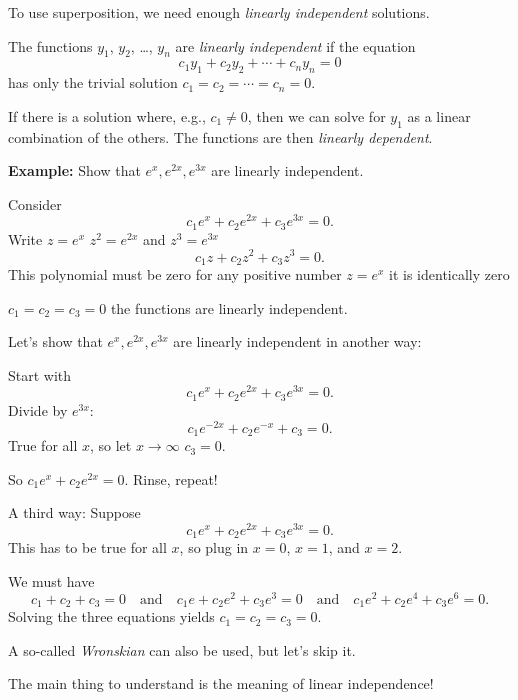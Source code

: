 \documentclass[10pt,aspectratio=169]{beamer}
\begin{document}
\begin{frame}

To use superposition, we need enough \emph{linearly independent} solutions.

\medskip
\pause

The functions $y_1$, $y_2$, \ldots, $y_n$ are \emph{linearly independent} if
the equation
\[
c_1 y_1 + c_2 y_2 + \cdots + c_n y_n = 0 
\]
has only the trivial solution $c_1 = c_2 = \cdots = c_n = 0$.

\medskip
\pause

If there is a solution where, e.g.,
$c_1 \neq 0$, then we
can solve for $y_1$ as a linear combination of the others.
\pause
The functions are then
\emph{linearly dependent}.

\medskip
\pause

\textbf{Example:} Show that $e^x, e^{2x}, e^{3x}$ are linearly independent.

\medskip
\pause

Consider
\[
c_1 e^x + c_2 e^{2x} + c_3 e^{3x} = 0.
\]
\pause
Write $z = e^x$
\pause
\wthus
$z^2 = e^{2x}$ and $z^3 = e^{3x}$ \pause \wthus
\[
c_1 z + c_2 z^2 + c_3 z^3 = 0.
\]
\pause
This polynomial must be zero for any positive number $z=e^{x}$
\pause
\wthus
it is identically zero

\pause
\thus
\quad
$c_1 = c_2 = c_3 = 0$
\pause
\wthus
the functions are linearly independent.
\end{frame}

\begin{frame}

Let's show that $e^x, e^{2x}, e^{3x}$ are linearly independent in another
way:

\medskip
\pause

Start with
\[
c_1 e^x + c_2 e^{2x} + c_3 e^{3x} = 0.
\]
\pause
Divide by $e^{3x}$:
\[
c_1 e^{-2x} + c_2 e^{-x} + c_3 = 0.
\]
\pause
True for all $x$, so let $x \to \infty$
\pause
\wthus $c_3 = 0$.

\medskip
\pause

So $c_1 e^x + c_2 e^{2x} = 0$.
\pause Rinse, repeat!

\medskip
\pause

A third way:  Suppose
\[
c_1 e^x + c_2 e^{2x} + c_3 e^{3x} = 0.
\]
This has to be true for all $x$, so plug in $x=0$, $x=1$, and $x=2$.

\medskip
\pause

We must have
\[
c_1 + c_2 + c_3 = 0
\quad\text{and}\quad
c_1 e + c_2 e^{2} + c_3 e^{3} = 0
\quad\text{and}\quad
c_1 e^2 + c_2 e^{4} + c_3 e^{6} = 0.
\]
\pause
Solving the three equations yields $c_1=c_2=c_3=0$.

\medskip
\pause

A so-called \emph{Wronskian} can also be used, but let's skip it.
\pause

The main thing to understand is the meaning of linear independence!

\end{frame}
\end{document}
